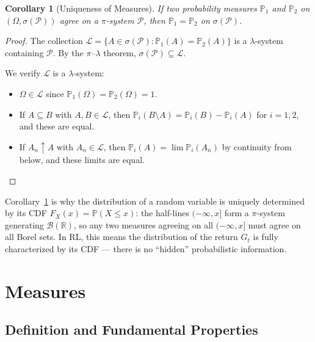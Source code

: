 \documentclass[11pt,a4paper]{article}
\theoremstyle{definition}
\theoremstyle{plain}
\newtheorem{corollary}[theorem]{Corollary}
\theoremstyle{remark}
\newcommand{\R}{\mathbb{R}}
\newcommand{\Prob}{\mathbb{P}}
\newcommand{\Borel}{\mathcal{B}}
\begin{document}
\begin{corollary}[Uniqueness of Measures]
\label{cor:uniqueness}
If two probability measures $\Prob_1$ and $\Prob_2$ on $(\Omega, \sigma(\mathcal{P}))$
agree on a $\pi$-system $\mathcal{P}$, then $\Prob_1 = \Prob_2$ on
$\sigma(\mathcal{P})$.
\end{corollary}

\begin{proof}
The collection $\mathcal{L} = \{A \in \sigma(\mathcal{P}) : \Prob_1(A) = \Prob_2(A)\}$
is a $\lambda$-system containing $\mathcal{P}$. By the $\pi$--$\lambda$ theorem,
$\sigma(\mathcal{P}) \subseteq \mathcal{L}$.

We verify $\mathcal{L}$ is a $\lambda$-system:
\begin{itemize}[nosep]
    \item $\Omega \in \mathcal{L}$ since $\Prob_1(\Omega) = \Prob_2(\Omega) = 1$.
    \item If $A \subseteq B$ with $A, B \in \mathcal{L}$, then $\Prob_i(B \setminus A) = \Prob_i(B) - \Prob_i(A)$ for $i = 1, 2$, and these are equal.
    \item If $A_n \uparrow A$ with $A_n \in \mathcal{L}$, then $\Prob_i(A) = \lim \Prob_i(A_n)$ by continuity from below, and these limits are equal. \qedhere
\end{itemize}
\end{proof}

\begin{rlconnection}[Connection to RL]
Corollary~\ref{cor:uniqueness} is why the distribution of a random variable
is uniquely determined by its CDF $F_X(x) = \Prob(X \leq x)$: the half-lines
$(-\infty, x]$ form a $\pi$-system generating $\Borel(\R)$, so any two measures
agreeing on all $(-\infty, x]$ must agree on all Borel sets. In RL, this means
the distribution of the return $G_t$ is fully characterized by its CDF --- there
is no ``hidden'' probabilistic information.
\end{rlconnection}

\section{Measures}
\label{sec:measures}

\subsection{Definition and Fundamental Properties}
\label{subsec:measure_def}
\end{document}
